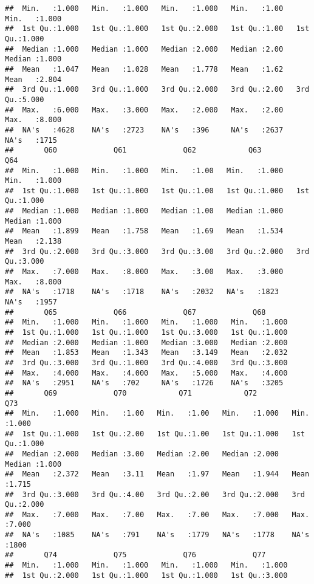 \documentclass[
]{article}
\begin{document}
\begin{verbatim}
##  Min.   :1.000   Min.   :1.000   Min.   :1.000   Min.   :1.00   Min.   :1.000  
##  1st Qu.:1.000   1st Qu.:1.000   1st Qu.:2.000   1st Qu.:1.00   1st Qu.:1.000  
##  Median :1.000   Median :1.000   Median :2.000   Median :2.00   Median :1.000  
##  Mean   :1.047   Mean   :1.028   Mean   :1.778   Mean   :1.62   Mean   :2.804  
##  3rd Qu.:1.000   3rd Qu.:1.000   3rd Qu.:2.000   3rd Qu.:2.00   3rd Qu.:5.000  
##  Max.   :6.000   Max.   :3.000   Max.   :2.000   Max.   :2.00   Max.   :8.000  
##  NA's   :4628    NA's   :2723    NA's   :396     NA's   :2637   NA's   :1715   
##       Q60             Q61             Q62            Q63             Q64       
##  Min.   :1.000   Min.   :1.000   Min.   :1.00   Min.   :1.000   Min.   :1.000  
##  1st Qu.:1.000   1st Qu.:1.000   1st Qu.:1.00   1st Qu.:1.000   1st Qu.:1.000  
##  Median :1.000   Median :1.000   Median :1.00   Median :1.000   Median :1.000  
##  Mean   :1.899   Mean   :1.758   Mean   :1.69   Mean   :1.534   Mean   :2.138  
##  3rd Qu.:2.000   3rd Qu.:3.000   3rd Qu.:3.00   3rd Qu.:2.000   3rd Qu.:3.000  
##  Max.   :7.000   Max.   :8.000   Max.   :3.00   Max.   :3.000   Max.   :8.000  
##  NA's   :1718    NA's   :1718    NA's   :2032   NA's   :1823    NA's   :1957   
##       Q65             Q66             Q67             Q68       
##  Min.   :1.000   Min.   :1.000   Min.   :1.000   Min.   :1.000  
##  1st Qu.:1.000   1st Qu.:1.000   1st Qu.:3.000   1st Qu.:1.000  
##  Median :2.000   Median :1.000   Median :3.000   Median :2.000  
##  Mean   :1.853   Mean   :1.343   Mean   :3.149   Mean   :2.032  
##  3rd Qu.:3.000   3rd Qu.:1.000   3rd Qu.:4.000   3rd Qu.:3.000  
##  Max.   :4.000   Max.   :4.000   Max.   :5.000   Max.   :4.000  
##  NA's   :2951    NA's   :702     NA's   :1726    NA's   :3205   
##       Q69             Q70            Q71            Q72             Q73       
##  Min.   :1.000   Min.   :1.00   Min.   :1.00   Min.   :1.000   Min.   :1.000  
##  1st Qu.:1.000   1st Qu.:2.00   1st Qu.:1.00   1st Qu.:1.000   1st Qu.:1.000  
##  Median :2.000   Median :3.00   Median :2.00   Median :2.000   Median :1.000  
##  Mean   :2.372   Mean   :3.11   Mean   :1.97   Mean   :1.944   Mean   :1.715  
##  3rd Qu.:3.000   3rd Qu.:4.00   3rd Qu.:2.00   3rd Qu.:2.000   3rd Qu.:2.000  
##  Max.   :7.000   Max.   :7.00   Max.   :7.00   Max.   :7.000   Max.   :7.000  
##  NA's   :1085    NA's   :791    NA's   :1779   NA's   :1778    NA's   :1800   
##       Q74             Q75             Q76             Q77       
##  Min.   :1.000   Min.   :1.000   Min.   :1.000   Min.   :1.000  
##  1st Qu.:2.000   1st Qu.:1.000   1st Qu.:1.000   1st Qu.:3.000  

\end{verbatim}
\end{document}
